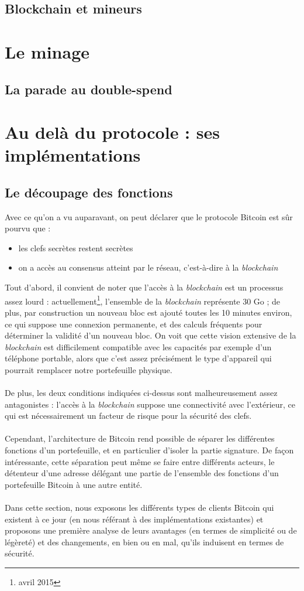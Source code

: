 \documentclass[11pt,a4paper]{article}
\begin{document}
\subsection{Blockchain et mineurs}

\section{Le minage}
\subsection{La parade au double-spend}

\section{Au delà du protocole : ses implémentations}
\subsection{Le découpage des fonctions}
Avec ce qu'on a vu auparavant, on peut déclarer que le protocole Bitcoin est sûr pourvu que :\begin{itemize}
	\item les clefs secrètes restent secrètes
	\item on a accès au consensus atteint par le réseau, c'est-à-dire à la \textit{blockchain}\\
\end{itemize}
Tout d'abord, il convient de noter que l'accès à la \textit{blockchain} est un processus assez lourd : actuellement\footnote{avril 2015}, l'ensemble de la \textit{blockchain} représente 30 Go ; de plus, par construction un nouveau bloc est ajouté toutes les 10 minutes environ, ce qui suppose une connexion permanente, et des calculs fréquents pour déterminer la validité d'un nouveau bloc. On voit que cette vision extensive de la \textit{blockchain} est difficilement compatible avec les capacités par exemple d'un téléphone portable, alors que c'est assez précisément le type d'appareil qui pourrait remplacer notre portefeuille physique.\\\\ 
De plus, les deux conditions indiquées ci-dessus sont malheureusement assez antagonistes : l'accès à la \textit{blockchain} suppose une connectivité avec l'extérieur, ce qui est nécessairement un facteur de risque pour la sécurité des clefs.\\\\
Cependant, l'architecture de Bitcoin rend possible de séparer les différentes fonctions d'un portefeuille, et en particulier d'isoler la partie signature. De façon intéressante, cette séparation peut même se faire entre différents acteurs, le détenteur d'une adresse délégant une partie de l'ensemble des fonctions d'un portefeuille Bitcoin à une autre entité.\\\\
Dans cette section, nous exposons les différents types de clients Bitcoin qui existent à ce jour (en nous référant à des implémentations existantes) et proposons une première analyse de leurs avantages (en termes de simplicité ou de légèreté) et des changements, en bien ou en mal, qu'ils induisent en termes de sécurité.
\end{document}
